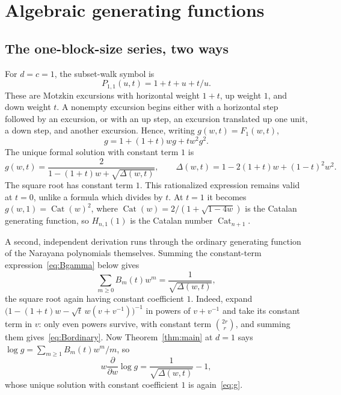 \documentclass[11pt]{article}
\numberwithin{equation}{section}
\theoremstyle{definition}
\newcommand{\Cat}{\operatorname{Cat}}
\begin{document}
\section{Algebraic generating functions}
\label{sec:algebraic}

\subsection{The one-block-size series, two ways}
\label{sec:oneblock}
For $d=c=1$, the subset-walk symbol is
\begin{equation}
 P_{1,1}(u,t)=1+t+u+t/u.
 \label{eq:motzkinsymbol}
\end{equation}
These are Motzkin excursions with horizontal weight $1+t$, up weight $1$,
and down weight $t$. A nonempty excursion begins either with a horizontal
step followed by an excursion, or with an up step, an excursion translated
up one unit, a down step, and another excursion. Hence, writing
$g(w,t)=F_1(w,t)$,
\begin{equation}
 g=1+(1+t)wg+tw^2g^2.\label{eq:quadratic}
\end{equation}
The unique formal solution with constant term $1$ is
\begin{equation}
 \boxed{g(w,t)=\frac{2}{1-(1+t)w+\sqrt{\Delta(w,t)}},}
 \qquad \Delta(w,t)=1-2(1+t)w+(1-t)^2w^2.
 \label{eq:g}
\end{equation}
The square root has constant term $1$. This rationalized expression remains
valid at $t=0$, unlike a formula which divides by $t$.
At $t=1$ it becomes $g(w,1)=\Cat(w)^2$, where
$\Cat(w)=2/(1+\sqrt{1-4w})$ is the Catalan generating function, so
$H_{n,1}(1)$ is the Catalan number $\Cat_{n+1}$.

A second, independent derivation runs through the ordinary generating function
of the Narayana polynomials themselves. Summing the constant-term
expression~\eqref{eq:Bgamma} below gives
\begin{equation}
 \sum_{m\geq0}B_m(t)w^m=\frac1{\sqrt{\Delta(w,t)}},
 \label{eq:Bordinary}
\end{equation}
the square root again having constant coefficient $1$. Indeed, expand
$\bigl(1-(1+t)w-\sqrt t\,w(v+v^{-1})\bigr)^{-1}$ in powers of $v+v^{-1}$ and
take its constant term in $v$: only even powers survive, with constant term
$\binom{2r}{r}$, and summing them gives~\eqref{eq:Bordinary}. Now
Theorem~\ref{thm:main} at $d=1$ says $\log g=\sum_{m\geq1}B_m(t)w^m/m$, so
\[
 w\frac{\partial}{\partial w}\log g=\frac1{\sqrt{\Delta(w,t)}}-1,
\]
whose unique solution with constant coefficient $1$ is again~\eqref{eq:g}.
\end{document}
